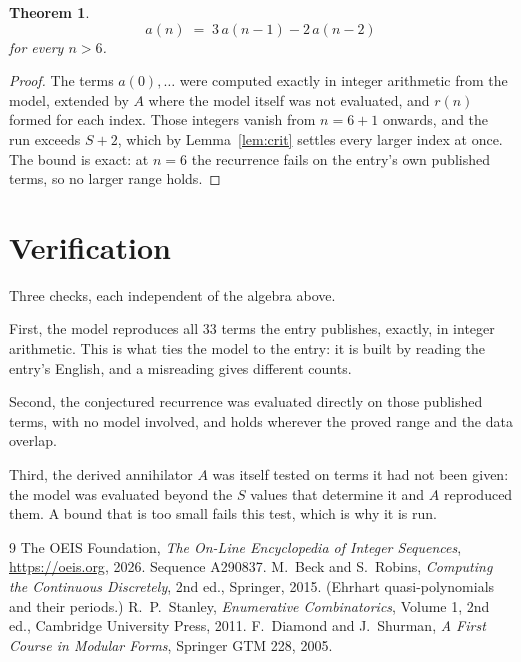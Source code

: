 \documentclass[11pt,a4paper]{article}
\theoremstyle{plain}
\newtheorem{theorem}{Theorem}
\theoremstyle{definition}
\begin{document}
\begin{theorem}
\[
a(n)\;=\;3\,a(n-1) - 2\,a(n-2)
\]
for every $n>6$.
\end{theorem}

\begin{proof}
The terms $a(0),\dots$ were computed exactly in integer arithmetic from the model, extended by
$A$ where the model itself was not evaluated, and $r(n)$ formed for each index. Those integers
vanish from $n=6+1$ onwards, and the run exceeds $S+2$, which by
Lemma~\ref{lem:crit} settles every larger index at once. The bound is exact: at $n=6$ the recurrence fails on the entry's own published terms, so no larger range holds.
\end{proof}

\section{Verification}

Three checks, each independent of the algebra above.

First, the model reproduces all $33$ terms the entry publishes, exactly, in integer
arithmetic. This is what ties the model to the entry: it is built by reading the entry's
English, and a misreading gives different counts.

Second, the conjectured recurrence was evaluated directly on those published terms, with no
model involved, and holds wherever the proved range and the data overlap.

Third, the derived annihilator $A$ was itself tested on terms it had not been given: the model
was evaluated beyond the $S$ values that determine it and $A$ reproduced them. A bound that is
too small fails this test, which is why it is run.

\begin{thebibliography}{9}
 The OEIS Foundation, \emph{The On-Line Encyclopedia of Integer
Sequences}, \url{https://oeis.org}, 2026. Sequence A290837.
 M.~Beck and S.~Robins, \emph{Computing the Continuous Discretely},
2nd ed., Springer, 2015. (Ehrhart quasi-polynomials and their periods.)
 R.~P.~Stanley, \emph{Enumerative Combinatorics}, Volume 1, 2nd ed.,
Cambridge University Press, 2011.
 F.~Diamond and J.~Shurman, \emph{A First Course in Modular Forms},
Springer GTM 228, 2005.
\end{thebibliography}
\end{document}
